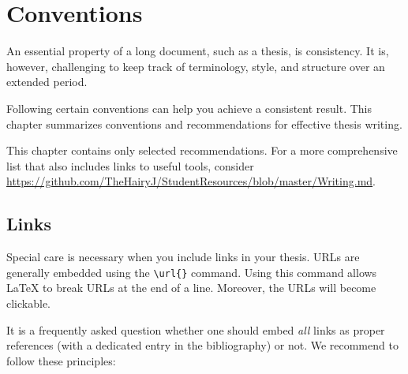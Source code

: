 
\chapter{Conventions} %

\label{Chapter2} %


\renewcommand{\keyword}[1]{\textbf{#1}}
\renewcommand{\tabhead}[1]{\textbf{#1}}
\renewcommand{\code}[1]{\texttt{#1}}
\renewcommand{\file}[1]{\texttt{#1}}
\renewcommand{\option}[1]{\texttt{\itshape#1}}




An essential property of a long document, such as a thesis, is consistency.%
It is, however, challenging to keep track of terminology, style, and structure over an extended period.

Following certain conventions can help you achieve a consistent result. This chapter summarizes conventions and recommendations for effective thesis writing.

This%
 chapter contains only selected recommendations. For a more comprehensive list that also includes links to useful tools, consider \url{https://github.com/TheHairyJ/StudentResources/blob/master/Writing.md}.

\section{Links}

Special care is necessary when you include links in your thesis. URLs are generally embedded using the \verb|\url{}| command. Using this command allows LaTeX to break URLs at the end of a line. Moreover, the URLs will become clickable.

It is a frequently asked question whether one should embed \emph{all} links as proper references (with a dedicated entry in the bibliography) or not. We recommend to follow these principles:%

